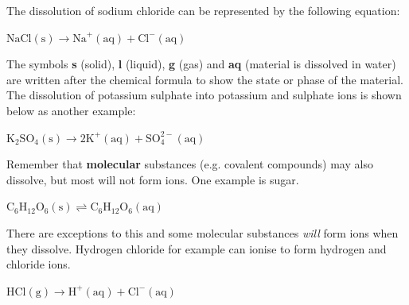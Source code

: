         \label{m38720*id335421}The dissolution of sodium chloride can be represented by the following equation:\par 
        \label{m38720*uid3241}$\mathrm{NaCl\left(s\right)}\to {\mathrm{Na}}^{+}\mathrm{\left(aq\right)}+{\mathrm{Cl}}^{-}\mathrm{\left(aq\right)}$
        \par 
        \label{m38720*id333999}The symbols \textbf{s} (solid), \textbf{l} (liquid), \textbf{g} (gas) and \textbf{aq} (material is dissolved in water) are written after the chemical formula to show the state or phase of the material. The dissolution of potassium sulphate into potassium and sulphate ions is shown below as another example:\par 
        \label{m38720*uid971321}${\mathrm{K}}_{2}{\mathrm{SO}}_{4}\mathrm{\left(s\right)}\to 2{\mathrm{K}}^{+}\mathrm{\left(aq\right)}+\mathrm{SO}_{4}^{2-}\mathrm{\left(aq\right)}$
        \par 
        \label{m38720*id335781}Remember that \textbf{molecular} substances (e.g. covalent compounds) may also dissolve, but most will not form ions. One example is sugar.\par 
        \label{m38720*uid922381}${\mathrm{C}}_{6}{\mathrm{H}}_{12}{\mathrm{O}}_{6}\mathrm{\left(s\right)}⇌{\mathrm{C}}_{6}{\mathrm{H}}_{12}{\mathrm{O}}_{6}\mathrm{\left(aq\right)}$
        \par 
        \label{m38720*id335863}There are exceptions to this and some molecular substances \textsl{will} form ions when they dissolve. Hydrogen chloride for example can ionise to form hydrogen and chloride ions.\par 
        \label{m38720*uid98732}$\mathrm{HCl\left(g\right)}\to {\mathrm{H}}^{+}\mathrm{\left(aq\right)}+{\mathrm{Cl}}^{-}\mathrm{\left(aq\right)}$
        \par 
\par
            \label{m38720*eip-687}\vspace{.5cm} 
      \noindent
